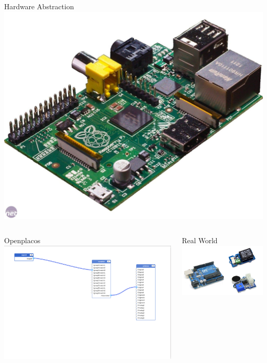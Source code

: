\documentclass{beamer}
\begin{document}
\begin{frame}{Hardware Abstraction}
\includegraphics[width=0.12\columnwidth]{figures/raspi.jpg}
\begin{columns}
\begin{column}[l]{0.5\textwidth}
Openplacos \\
\includegraphics[width=0.9\columnwidth]{figures/config1.png}
\end{column}
\begin{column}[r]{0.5\textwidth}
Real World
\includegraphics[width=\columnwidth]{figures/HWworld.png}
\end{column}
\end{columns}
\end{frame}
\end{document}
